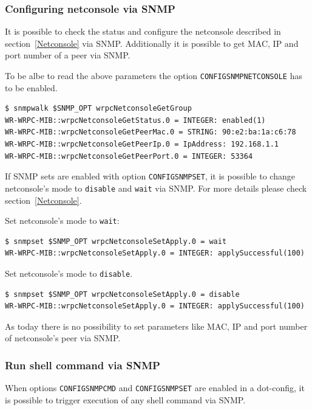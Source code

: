 \documentclass[a4paper, 12pt]{article}
\renewcommand{\_}{\underscore\allowbreak}
\begin{document}
\subsubsection{Configuring netconsole via SNMP}
\label{Configuring netconsole via SNMP}

It is possible to check the status and configure the netconsole described in
section~\ref{Netconsole} via SNMP. Additionally it is possible to get MAC, IP
and port number of a peer via SNMP.

To be albe to read the above parameters the option
\texttt{CONFIG\_SNMP\_NETCONSOLE} has to be enabled.
\begin{lstlisting}
$ snmpwalk $SNMP_OPT wrpcNetconsoleGetGroup
WR-WRPC-MIB::wrpcNetconsoleGetStatus.0 = INTEGER: enabled(1)
WR-WRPC-MIB::wrpcNetconsoleGetPeerMac.0 = STRING: 90:e2:ba:1a:c6:78
WR-WRPC-MIB::wrpcNetconsoleGetPeerIp.0 = IpAddress: 192.168.1.1
WR-WRPC-MIB::wrpcNetconsoleGetPeerPort.0 = INTEGER: 53364
\end{lstlisting}

If SNMP sets are enabled with option \texttt{CONFIG\_SNMP\_SET}, it is possible
to change netconsole's mode to \texttt{disable} and \texttt{wait} via SNMP.
For more details please check section~\ref{Netconsole}.

Set netconsole's mode to \texttt{wait}:
\begin{lstlisting}
$ snmpset $SNMP_OPT wrpcNetconsoleSetApply.0 = wait
WR-WRPC-MIB::wrpcNetconsoleSetApply.0 = INTEGER: applySuccessful(100)
\end{lstlisting}

Set netconsole's mode to \texttt{disable}.
\begin{lstlisting}
$ snmpset $SNMP_OPT wrpcNetconsoleSetApply.0 = disable
WR-WRPC-MIB::wrpcNetconsoleSetApply.0 = INTEGER: applySuccessful(100)
\end{lstlisting}


As today there is no possibility to set parameters like MAC, IP and port number
of netconsole's peer via SNMP.

\subsubsection{Run shell command via SNMP}
\label{Run shell command via SNMP}

When options \texttt{CONFIG\_SNMP\_CMD} and \texttt{CONFIG\_SNMP\_SET} are
enabled in a dot-config, it is possible to trigger execution of any shell
command via SNMP.
\end{document}
